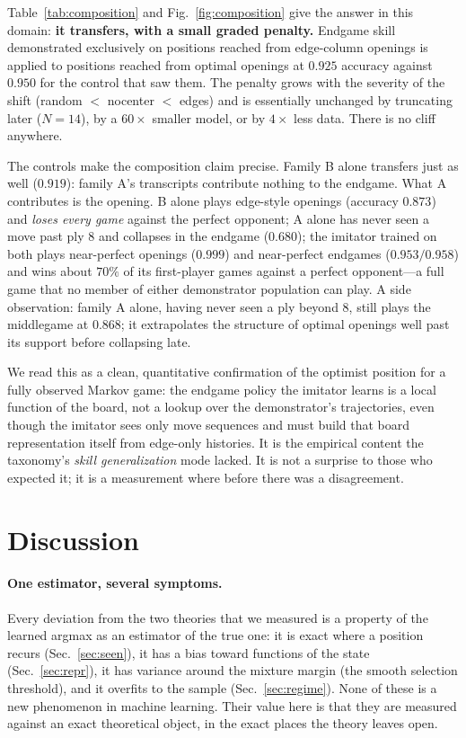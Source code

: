 \documentclass[11pt]{article}
\begin{document}
Table~\ref{tab:composition} and Fig.~\ref{fig:composition} give the answer in this domain: \textbf{it transfers, with a small graded penalty.} Endgame skill demonstrated exclusively on positions reached from edge-column openings is applied to positions reached from optimal openings at $0.925$ accuracy against $0.950$ for the control that saw them. The penalty grows with the severity of the shift (random $<$ nocenter $<$ edges) and is essentially unchanged by truncating later ($N=14$), by a $60\times$ smaller model, or by $4\times$ less data. There is no cliff anywhere.

The controls make the composition claim precise. Family B alone transfers just as well ($0.919$): family A's transcripts contribute nothing to the endgame. What A contributes is the opening. B alone plays edge-style openings (accuracy $0.873$) and \emph{loses every game} against the perfect opponent; A alone has never seen a move past ply 8 and collapses in the endgame ($0.680$); the imitator trained on both plays near-perfect openings ($0.999$) and near-perfect endgames ($0.953/0.958$) and wins about $70\%$ of its first-player games against a perfect opponent---a full game that no member of either demonstrator population can play. A side observation: family A alone, having never seen a ply beyond 8, still plays the middlegame at $0.868$; it extrapolates the structure of optimal openings well past its support before collapsing late.

We read this as a clean, quantitative confirmation of the optimist position for a fully observed Markov game: the endgame policy the imitator learns is a local function of the board, not a lookup over the demonstrator's trajectories, even though the imitator sees only move sequences and must build that board representation itself from edge-only histories. It is the empirical content the taxonomy's \emph{skill generalization} mode lacked. It is not a surprise to those who expected it; it is a measurement where before there was a disagreement.

\section{Discussion}

\paragraph{One estimator, several symptoms.} Every deviation from the two theories that we measured is a property of the learned argmax as an estimator of the true one: it is exact where a position recurs (Sec.~\ref{sec:seen}), it has a bias toward functions of the state (Sec.~\ref{sec:repr}), it has variance around the mixture margin (the smooth selection threshold), and it overfits to the sample (Sec.~\ref{sec:regime}). None of these is a new phenomenon in machine learning. Their value here is that they are measured against an exact theoretical object, in the exact places the theory leaves open.
\end{document}

